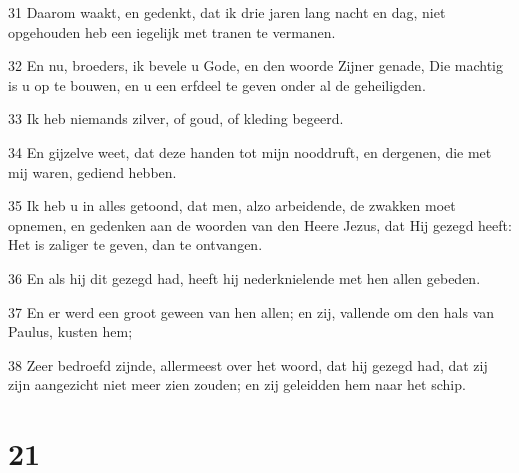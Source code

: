 \par 31 Daarom waakt, en gedenkt, dat ik drie jaren lang nacht en dag, niet opgehouden heb een iegelijk met tranen te vermanen.
\par 32 En nu, broeders, ik bevele u Gode, en den woorde Zijner genade, Die machtig is u op te bouwen, en u een erfdeel te geven onder al de geheiligden.
\par 33 Ik heb niemands zilver, of goud, of kleding begeerd.
\par 34 En gijzelve weet, dat deze handen tot mijn nooddruft, en dergenen, die met mij waren, gediend hebben.
\par 35 Ik heb u in alles getoond, dat men, alzo arbeidende, de zwakken moet opnemen, en gedenken aan de woorden van den Heere Jezus, dat Hij gezegd heeft: Het is zaliger te geven, dan te ontvangen.
\par 36 En als hij dit gezegd had, heeft hij nederknielende met hen allen gebeden.
\par 37 En er werd een groot geween van hen allen; en zij, vallende om den hals van Paulus, kusten hem;
\par 38 Zeer bedroefd zijnde, allermeest over het woord, dat hij gezegd had, dat zij zijn aangezicht niet meer zien zouden; en zij geleidden hem naar het schip.

\chapter{21}


